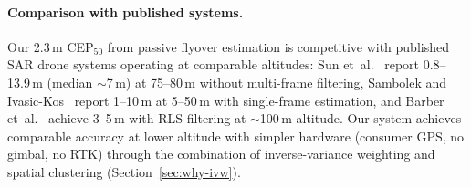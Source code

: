 \paragraph{Comparison with published systems.}  Our 2.3\,m CEP$_{50}$ from passive flyover estimation is competitive with published SAR drone systems operating at comparable altitudes: Sun et~al.~\cite{sun2016sar} report 0.8--13.9\,m (median $\sim$7\,m) at 75--80\,m without multi-frame filtering, Sambolek and Ivasic-Kos~\cite{sambolek2025person} report 1--10\,m at 5--50\,m with single-frame estimation, and Barber et~al.~\cite{barber2006vision} achieve 3--5\,m with RLS filtering at $\sim$100\,m altitude.  Our system achieves comparable accuracy at lower altitude with simpler hardware (consumer GPS, no gimbal, no RTK) through the combination of inverse-variance weighting and spatial clustering (Section~\ref{sec:why-ivw}).
